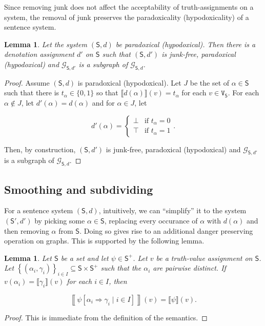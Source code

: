 \documentclass[12pt]{kluwer}
\newtheorem{lem}[thm]{Lemma}
\theoremstyle{remark}
\newcommand{\fancy}[1]{\mathcal{#1}}
\def\S{\textsf{S}}
\def\V{\texttt{V}}
\def\G{\fancy{G}}
\begin{document}
Since removing junk does not affect the acceptability of truth-assignments on a system, the removal of junk preserves the paradoxicality (hypodoxicality) of a sentence system.

\begin{lem}\label{JunkRemoval}
Let the system $(\S, d)$ be paradoxical (hypodoxical).  Then there is a denotation assignment $d'$ on $\S$ such that $(\S, d')$ is junk-free, paradoxical (hypodoxical) and $\G_{\S, d'}$ is a subgraph of $\G_{\S, d}$.
\end{lem}
\begin{proof}
Assume $(\S, d)$ is paradoxical (hypodoxical). Let $J$ be the set of $\alpha \in \S$ such that there is $t_{\alpha} \in \{0, 1\}$ so that $\llbracket d(\alpha) \rrbracket(v) = t_{\alpha}$ for each $v \in \V_\S$.  For each $\alpha \not \in J$, let $d'(\alpha) = d(\alpha)$ and for $\alpha \in J$, let 

\[d'(\alpha) = \begin{cases}
\bot & \text{if } t_{\alpha} = 0 \\
\top & \text{if }  t_{\alpha} = 1
\end{cases}.\]

Then, by construction, $(\S, d')$ is junk-free, paradoxical (hypodoxical) and $\G_{\S, d'}$ is a subgraph of $\G_{\S, d}$.
\end{proof}

\subsection{Smoothing and subdividing}

For a sentence system $(\S, d)$, intuitively, we can ``simplify'' it to the system $(\S', d')$ by picking some $\alpha \in \S$, replacing every occurance of $\alpha$ with $d(\alpha)$ and then removing $\alpha$ from $\S$.  Doing so gives rise to an additional danger preserving operation on graphs.  This is supported by the following lemma.

\begin{lem}\label{SubstitutionLemma}
Let $\S$ be a set and let $\psi \in \S^+$.  Let $v$ be a truth-value assignment on $\S$.  Let $\left\{ (\alpha_i, \gamma_i)\right\}_{i \in I} \subseteq \S \times \S^+$ such that the $\alpha_i$ are pairwise distinct. If $v(\alpha_i) = \llbracket \gamma_i \rrbracket(v)$ for each $i \in I$, then

\[\left\llbracket \psi\left[\alpha_i \Rightarrow \gamma_i \mid i \in I\right]\right\rrbracket(v) = \llbracket \psi \rrbracket(v).\] 
\end{lem}
\begin{proof}
This is immediate from the definition of the semantics.
\end{proof}
\end{document}
